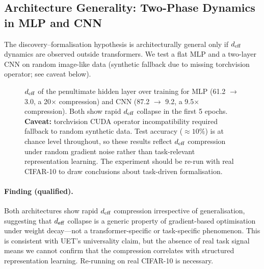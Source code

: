 \subsection{Architecture Generality: Two-Phase Dynamics in MLP and CNN}
\label{sec:arch-diversity}

The discovery--formalisation hypothesis is architecturally general only if $d_{\mathrm{eff}}$ dynamics
are observed outside transformers.
We test a flat MLP and a two-layer CNN on random image-like data
(synthetic fallback due to missing torchvision operator; see caveat below).

\begin{figure}[H]
\centering
{}
\caption{$d_{\mathrm{eff}}$ of the penultimate hidden layer over training for MLP
(61.2 $\to$ 3.0, a 20$\times$ compression) and CNN (87.2 $\to$ 9.2, a 9.5$\times$
compression). Both show rapid $d_{\mathrm{eff}}$ collapse in the first 5 epochs.
\textbf{Caveat:} torchvision CUDA operator incompatibility required fallback to
random synthetic data. Test accuracy ($\approx10\%$) is at chance level throughout,
so these results reflect $d_{\mathrm{eff}}$ compression under random gradient noise rather than
task-relevant representation learning. The experiment should be re-run with real
CIFAR-10 to draw conclusions about task-driven formalisation.}
\label{fig:arch-diversity}
\end{figure}

\paragraph{Finding (qualified).}
Both architectures show rapid $d_{\mathrm{eff}}$ compression irrespective of generalisation,
suggesting that $d_{\mathrm{eff}}$ collapse is a generic property of gradient-based
optimisation under weight decay---not a transformer-specific or task-specific phenomenon.
This is consistent with UET's universality claim, but the absence of real task signal
means we cannot confirm that the compression correlates with structured representation
learning. Re-running on real CIFAR-10 is necessary.

